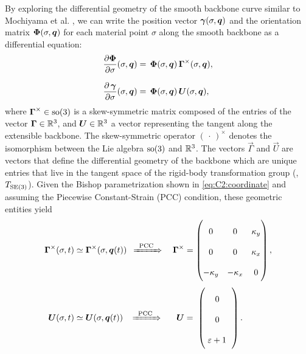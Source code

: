 By exploring the differential geometry of the smooth backbone curve similar to Mochiyama et al. \cite{Mochiyama2003}, we can write the position vector ${\boldsymbol{\gamma}}(\sigma,{\boldsymbol{q}})$ and the orientation matrix ${\boldsymbol{\Phi}}(\sigma,{\boldsymbol{q}})$ for each material point $\sigma$ along the smooth backbone as a differential equation:
%
\begin{align}
\renewcommand*{\arraystretch}{2}{}
\frac{\partial \,\!\mat{\Phi}}{\partial \sigma}(\sigma,\q) & = \, \mat{\Phi}(\sigma,\vec{q}) \,\mat{\Gamma}^{\times} (\sigma,\q), \label{eq:C2:change_phi} \\[0.75em]
%
\frac{\partial \, \gammaB}{\partial \sigma}(\sigma,\q) & = \, \mat{\Phi}(\sigma,\vec{q}) \, \vec{U}(\sigma,\q), \label{eq:C2:change_p}
\end{align}
%
where  $\boldsymbol{\Gamma}^\times \in \textup{\textrm{so}}(3)$  is a skew-symmetric matrix composed of the entries of the vector $\boldsymbol{\Gamma} \in \mathbb{R}^3$, and $\boldsymbol{U}\in \mathbb{R}^3$ a vector representing the tangent along the extensible backbone. The skew-symmetric operator $(\,\cdot\,)^\times$ denotes the isomorphism between the Lie algebra $\textup{\textrm{so}}(3)$ and $\mathbb{R}^3$. The vectors $\vec{\Gamma}$ and $\vec{U}$ are vectors that define the differential geometry of the backbone
\cite{Mochiyama2003} which are unique entries that live in the tangent space of the rigid-body transformation group (\ie, $T_{\textup{\textrm{SE}}(3)}$). Given the Bishop parametrization shown in \eqref{eq:C2:coordinate} and assuming the Piecewise Constant-Strain (PCC) condition, these geometric entities yield
%
\begin{align}
\vec{\Gamma}^\times(\sigma,t) & \simeq \vec{\Gamma}^\times(\sigma,\q(t)) \!\!\!\quad \xRightarrow[]{\textrm{\;\;PCC\;\;}}\quad \vec{\Gamma}^\times = \begin{pmatrix} 0 & 0 & \kappa_y \\ 0 & 0 & \kappa_x \\ -\kappa_y & -\kappa_x & 0 \end{pmatrix}, \label{eq:C2:Gamma}\\[0.35em]
%
\vec{U}(\sigma,t) & \simeq \vec{U}(\sigma,\q(t)) \!\quad \xRightarrow[]{\textrm{\;\;PCC\;\;}} \quad \;\; \vec{U} = \;\begin{pmatrix} \;0\;\; \\  \;0\;\; \\ \;\varepsilon + 1\;\ \end{pmatrix}. \label{eq:C2:U}
\end{align}
%
